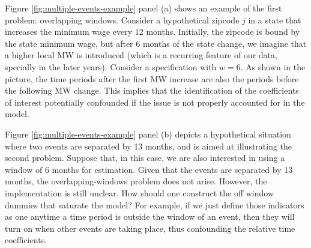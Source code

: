     Figure \ref{fig:multiple-events-example} panel (a) shows an example of the first problem: overlapping windows. Consider a hypothetical zipcode $j$ in a state that increases the minimum wage every 12 months. Initially, the zipcode is bound by the state minimum wage, but after 6 months of the state change, we imagine that a higher local MW is introduced (which is a recurring feature of our data, specially in the later years). Consider a specification with $w = 6$. As shown in the picture, the time periods after the first MW increase are also the periods before the following MW change. This implies that the identification of the coefficients of interest potentially confounded if the issue is not properly accounted for in the model.
    
    Figure \ref{fig:multiple-events-example} panel (b) depicts a hypothetical situation where two events are separated by 13 months, and is aimed at illustrating the second problem. Suppose that, in this case, we are also interested in using a window of 6 months for estimation. Given that the events are separated by 13 months, the overlapping-windows problem does not arise. However, the implementation is still unclear. How should one construct the off window dummies that saturate the model? For example, if we just define those indicators as one anytime a time period is outside the window of an event, then they will turn on when other events are taking place, thus confounding the relative time coefficients.
    
